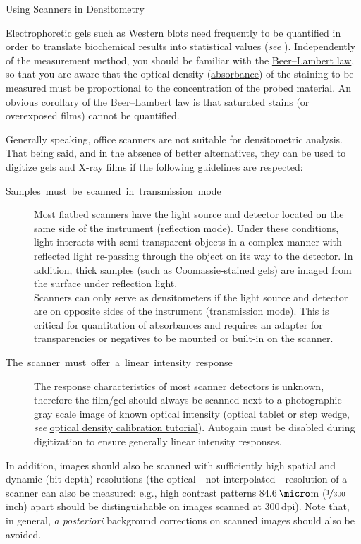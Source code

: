 \begin{infobox}[H]
\caption{\label{infobox:Densitometry}Using Scanners in Densitometry}


Electrophoretic gels such as
Western blots need frequently to be quantified in order to translate
biochemical results into statistical values (\emph{see} ).
Independently of the measurement method, you should be familiar with
the \href{http://en.wikipedia.org/wiki/Beer\%E2\%80\%93Lambert_law }{Beer--Lambert law},
so that you are aware that the optical density (\href{http://en.wikipedia.org/wiki/Absorbance}{absorbance})
of the staining to be measured must be proportional to the concentration
of the probed material. An obvious corollary of the Beer--Lambert
law is that saturated stains (or overexposed films) cannot be quantified.\vspace*{\medskipamount}


Generally speaking, office scanners are not suitable for densitometric
analysis. That being said, and in the absence of better alternatives,
they can be used to digitize gels and X-ray films if the following
guidelines are respected:
\begin{description}
\item [{Samples~must~be~scanned~in~transmission~mode}] Most flatbed
scanners have the light source and detector located on the same side
of the instrument (reflection mode). Under these conditions, light
interacts with semi-transparent objects in a complex manner with reflected
light re-passing through the object on its way to the detector. In
addition, thick samples (such as Coomassie-stained gels) are imaged
from the surface under reflection light.\\
Scanners can only serve as densitometers if the light source and detector
are on opposite sides of the instrument (transmission mode). This
is critical for quantitation of absorbances and requires an adapter
for transparencies or negatives to be mounted or built-in on the scanner.
\item [{The~scanner~must~offer~a~linear~intensity~response}] The
response characteristics of most scanner detectors is unknown, therefore
the film/gel should always be scanned next to a photographic gray
scale image of known optical intensity (optical tablet or step wedge,
\emph{see} \href{http://imagej.nih.gov/ij/docs/examples/calibration/}{optical density calibration tutorial}).
Autogain must be disabled during digitization to ensure generally
linear intensity responses.
\end{description}
In addition, images should also be scanned with sufficiently high
spatial and dynamic (bit-depth) resolutions (the optical---not interpolated---resolution
of a scanner can also be measured: e.g., high contrast patterns 84.6\,$\micro$m
($\nicefrac{1}{300}$\,inch) apart should be distinguishable on images
scanned at 300\,dpi). Note that, in general, \emph{a posteriori}
background corrections on scanned images should also be avoided.\vspace*{\medskipamount}



\end{infobox}
